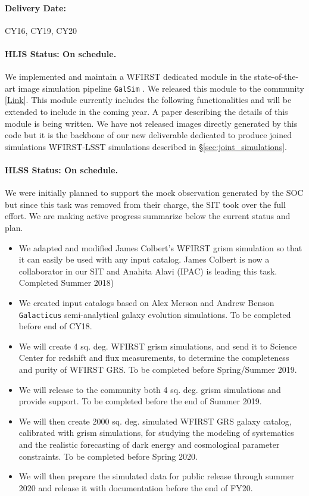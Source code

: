 \paragraph*{Delivery Date:} CY16, CY19, CY20

\paragraph*{HLIS Status: On schedule.} We implemented and maintain a
WFIRST dedicated module in the state-of-the-art image simulation
pipeline \texttt{GalSim} \citep{Rowe:2015}. We released this module to the community
\href{https://github.com/GalSim-developers/GalSim}{[Link]}. This module currently includes the following functionalities  and will be extended to include  in the coming year. A paper describing the details of this module is being written. We have not released images directly generated by this code but it is the backbone of our new deliverable dedicated to produce joined simulations WFIRST-LSST simulations described in \S\ref{sec:joint_simulations}.


\paragraph*{HLSS Status: On schedule.} We were initially planned to support the mock observation generated by the SOC but since this task was removed from their charge, the SIT took over the full effort. We are making active progress summarize below the current status and plan.
\begin{itemize}
\item We adapted and modified James Colbert's WFIRST grism simulation so that it can easily be used with any input catalog. James Colbert is now a collaborator in our SIT and Anahita Alavi (IPAC) is leading this task. Completed Summer 2018)
\item We created input catalogs based on Alex Merson and Andrew Benson \texttt{Galacticus} semi-analytical galaxy evolution simulations. To be completed before end of CY18.
\item We will create 4 sq. deg. WFIRST grism simulations, and send it to Science Center for redshift and flux measurements, to determine the completeness and purity of WFIRST GRS.  To be completed before Spring/Summer 2019.
\item We will release to the community both 4 sq. deg. grism simulations and provide support. To be completed before the end of Summer 2019.
\item We will then create 2000 sq. deg. simulated WFIRST GRS galaxy catalog, calibrated with grism simulations, for studying the modeling of systematics and the realistic forecasting of dark energy and cosmological parameter constraints. To be completed before Spring 2020.
\item We will then prepare the simulated data for public release through summer 2020 and release it with documentation before the end of FY20.
\end{itemize}


